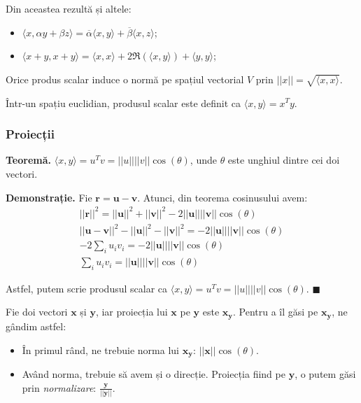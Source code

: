\documentclass{exam}
\begin{document}
Din aceastea rezultă și altele:
\begin{itemize}
	\item $\langle x, \alpha y + \beta z \rangle = \overline{\alpha} \langle x, y \rangle + \overline{\beta} \langle x, z \rangle$;
	\item $\langle x + y, x + y \rangle = \langle x, x \rangle + 2 \Re(\langle x, y \rangle) +\langle y, y \rangle$;
\end{itemize}

Orice produs scalar induce o normă pe spațiul vectorial $V$ prin
$||x|| = \sqrt{\langle x, x \rangle}$.

Într-un spațiu euclidian, produsul
scalar este definit ca $\langle x, y \rangle = x^Ty$.

\subsubsection{Proiecții}

\textbf{Teoremă.} $\langle x, y \rangle = u^Tv = ||u||||v||\cos(\theta)$, unde $\theta$ este unghiul dintre cei doi vectori.

\textbf{Demonstrație.} Fie $\mathbf{r} = \mathbf{u} - \mathbf{v}$. Atunci,
din teorema cosinusului avem:
\begin{gather*}
	||\mathbf{r}||^2 = ||\mathbf{u}||^2 + ||\mathbf{v}||^2 - 2||\mathbf{u}||||\mathbf{v}||\cos(\theta) \\
	||\mathbf{u} - \mathbf{v}||^2 - ||\mathbf{u}||^2 - ||\mathbf{v}||^2 = -2||\mathbf{u}||||\mathbf{v}||\cos(\theta) \\
	-2 \sum_{i} u_iv_i = -2||\mathbf{u}||||\mathbf{v}||\cos(\theta) \\
	\sum_{i} u_iv_i = ||\mathbf{u}||||\mathbf{v}||\cos(\theta)
\end{gather*}

Astfel, putem scrie produsul scalar ca $\langle x, y \rangle = u^Tv = ||u||||v||\cos(\theta)$. $\blacksquare$

Fie doi vectori $\mathbf{x}$ și $\mathbf{y}$, iar proiecția lui $\mathbf{x}$
pe $\mathbf{y}$ este $\mathbf{x_y}$. Pentru a îl găsi pe $\mathbf{x_y}$, ne
gândim astfel:
\begin{itemize}
	\item În primul rând, ne trebuie norma lui $\mathbf{x_y}$: $||\mathbf{x}||\cos(\theta)$.
	\item Având norma, trebuie să avem și o direcție. Proiecția fiind pe $\mathbf{y}$,
	      o putem găsi prin \textit{normalizare}: $\frac{\mathbf{y}}{||\mathbf{y}||}$.
\end{itemize}
\end{document}
